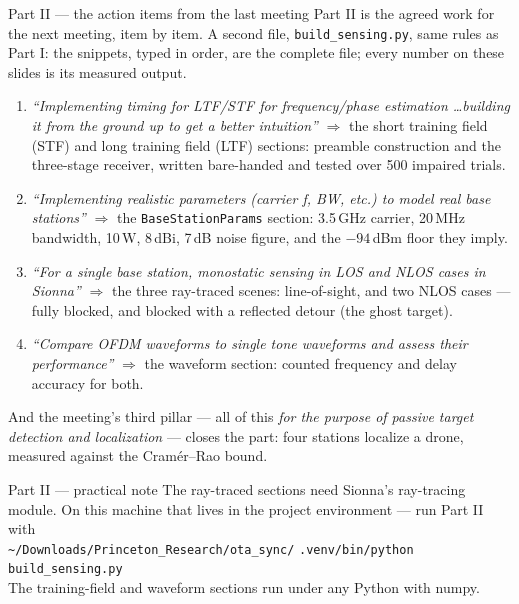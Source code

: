 \documentclass[10pt]{beamer}
\begin{document}
\begin{frame}{Part II --- the action items from the last meeting}
  Part II is the agreed work for the next meeting, item by item. A
  second file, \texttt{build\_sensing.py}, same rules as Part I: the
  snippets, typed in order, are the complete file; every number on
  these slides is its measured output.
  \begin{enumerate}
    \item \emph{``Implementing timing for LTF/STF for
      frequency/phase estimation \ldots building it from the ground
      up to get a better intuition''} $\Rightarrow$ the short
      training field (STF) and long training field (LTF) sections:
      preamble construction and the three-stage receiver, written
      bare-handed and tested over 500 impaired trials.
    \item \emph{``Implementing realistic parameters (carrier f, BW,
      etc.) to model real base stations''} $\Rightarrow$ the
      \texttt{BaseStationParams} section: 3.5\,GHz carrier, 20\,MHz
      bandwidth, 10\,W, 8\,dBi, 7\,dB noise figure, and the
      $-94$\,dBm floor they imply.
    \item \emph{``For a single base station, monostatic sensing in
      LOS and NLOS cases in Sionna''} $\Rightarrow$ the three
      ray-traced scenes: line-of-sight, and two NLOS cases ---
      fully blocked, and blocked with a reflected detour (the ghost
      target).
    \item \emph{``Compare OFDM waveforms to single tone waveforms
      and assess their performance''} $\Rightarrow$ the waveform
      section: counted frequency and delay accuracy for both.
  \end{enumerate}
  \vspace{0.3em}
  And the meeting's third pillar --- all of this \emph{for the
  purpose of passive target detection and localization} --- closes
  the part: four stations localize a drone, measured against the
  Cram\'er--Rao bound.
\end{frame}

\begin{frame}{Part II --- practical note}
  The ray-traced sections need Sionna's ray-tracing module. On this
  machine that lives in the project environment --- run Part II
  with\\[0.3em]
  \texttt{\textasciitilde/Downloads/Princeton\_Research/ota\_sync/}
  \texttt{.venv/bin/python build\_sensing.py}\\[0.3em]
  The training-field and waveform sections run under any Python
  with numpy.
\end{frame}
\end{document}
